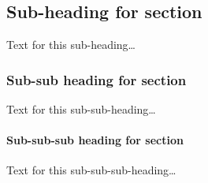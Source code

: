 \documentclass{bmcart}
\begin{document}
		\subsection*{Sub-heading for section}
			Text for this sub-heading\ldots
	
			\subsubsection*{Sub-sub heading for section}
				Text for this sub-sub-heading\ldots
					
					\paragraph*{Sub-sub-sub heading for section}
						Text for this sub-sub-sub-heading\ldots
	
	
	
	
	
	
	
	
	
	
	
\end{document}
